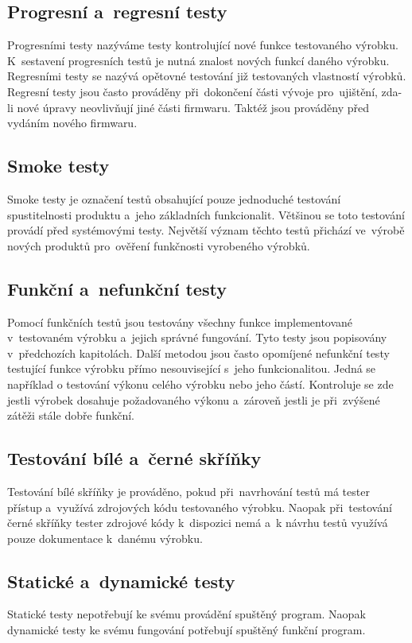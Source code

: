 \subsection{Progresní a~regresní testy}
Progresními testy nazýváme testy kontrolující nové funkce testovaného výrobku. K~sestavení progresních testů je nutná znalost nových funkcí daného výrobku. Regresními testy se nazývá opětovné testování již testovaných vlastností výrobků. Regresní testy jsou často prováděny při~dokončení části vývoje pro~ujištění, zda-li nové úpravy neovlivňují jiné části firmwaru. Taktéž jsou prováděny před vydáním nového firmwaru.

\subsection{Smoke testy}
Smoke testy je označení testů obsahující pouze jednoduché testování spustitelnosti produktu a~jeho základních funkcionalit. Většinou se toto testování provádí před systémovými testy. Největší význam těchto testů přichází ve~výrobě nových produktů pro~ověření funkčnosti vyrobeného výrobků.

\subsection{Funkční a~nefunkční testy}
Pomocí funkčních testů jsou testovány všechny funkce implementované v~testovaném výrobku a~jejich správné fungování. Tyto testy jsou popisovány v~předchozích kapitolách. Další metodou jsou často opomíjené nefunkční testy testující funkce výrobku přímo nesouvisející s~jeho funkcionalitou. Jedná se například o testování výkonu celého výrobku nebo jeho částí. Kontroluje se zde jestli výrobek dosahuje požadovaného výkonu a~zároveň jestli je při~zvýšené zátěži stále dobře funkční.

\subsection{Testování bílé a~černé skříňky}
Testování bílé skříňky je prováděno, pokud při~navrhování testů má tester přístup a~využívá zdrojových kódu testovaného výrobku. Naopak při~testování černé skříňky tester zdrojové kódy k~dispozici nemá a~k návrhu testů využívá pouze dokumentace k~danému výrobku.

\subsection{Statické a~dynamické testy}
Statické testy nepotřebují ke svému provádění spuštěný program. Naopak dynamické testy ke svému fungování potřebují spuštěný funkční program. \cite{MBT2}

\endinput
